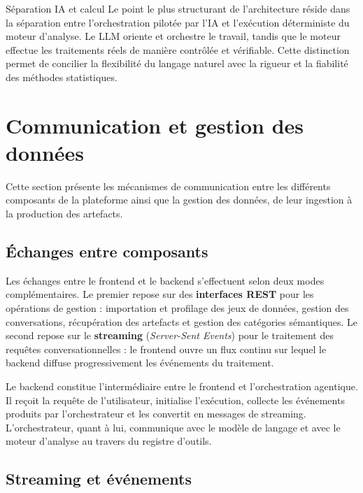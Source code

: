 \begin{infobox}{Séparation IA et calcul}
Le point le plus structurant de l'architecture réside dans la séparation entre l'orchestration pilotée par l'IA et l'exécution déterministe du moteur d'analyse. Le LLM oriente et orchestre le travail, tandis que le moteur effectue les traitements réels de manière contrôlée et vérifiable. Cette distinction permet de concilier la flexibilité du langage naturel avec la rigueur et la fiabilité des méthodes statistiques.
\end{infobox}

\section{Communication et gestion des données}

Cette section présente les mécanismes de communication entre les différents composants de la plateforme ainsi que la gestion des données, de leur ingestion à la production des artefacts.

\subsection{Échanges entre composants}

Les échanges entre le frontend et le backend s'effectuent selon deux modes complémentaires. Le premier repose sur des \textbf{interfaces REST} pour les opérations de gestion : importation et profilage des jeux de données, gestion des conversations, récupération des artefacts et gestion des catégories sémantiques. Le second repose sur le \textbf{streaming} (\textit{Server-Sent Events}) pour le traitement des requêtes conversationnelles : le frontend ouvre un flux continu sur lequel le backend diffuse progressivement les événements du traitement.

Le backend constitue l'intermédiaire entre le frontend et l'orchestration agentique. Il reçoit la requête de l'utilisateur, initialise l'exécution, collecte les événements produits par l'orchestrateur et les convertit en messages de streaming. L'orchestrateur, quant à lui, communique avec le modèle de langage et avec le moteur d'analyse au travers du registre d'outils.

\subsection{Streaming et événements}

